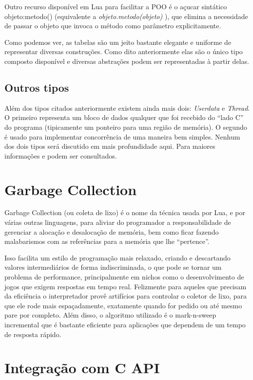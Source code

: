 \documentclass[a4paper,12pt]{abnt}
\begin{document}
Outro recurso disponível em Lua para facilitar a POO é o açucar sintático
objeto:metodo() (equivalente a \emph{objeto.metodo(objeto)} ), que elimina a
necessidade de passar o objeto que invoca o método como parâmetro explicitamente.

Como podemos ver, as tabelas são um jeito bastante elegante e uniforme de
representar diversas construções.
Como dito anteriormente elas são o único tipo composto disponível e
diversas abstrações podem ser representadas à partir delas.

\section{Outros tipos}

Além dos tipos citados anteriormente existem ainda mais dois:
\emph{Userdata} e \emph{Thread}. O primeiro representa um bloco de dados qualquer que
foi recebido do ``{}lado C''{} do programa (tipicamente um ponteiro para uma região de memória).
O segundo é usado para implementar concorrência de uma maneira bem simples.
Nenhum dos dois tipos será discutido em mais profundidade aqui. Para maiores
informações \cite{pil} e \cite{luamanual} podem ser consultados.

\chapter{Garbage Collection}

Garbage Collection (ou coleta de lixo) é o nome da técnica usada por Lua, e
por várias outras linguagens, para aliviar do programador a responsabilidade
de gerenciar a alocação e desalocação de memória, bem como ficar fazendo
malabarismos com as referências para a memória que lhe ``{}pertence''{}.

Isso facilita um estilo de programação mais relaxado,
criando e descartando valores
intermediários de forma indiscriminada, o que pode se tornar um problema de performance,
principalmente em nichos como o desenvolvimento de
jogos que exigem respostas em tempo real.
Felizmente para aqueles que precisam da eficiência o
interpretador provê artifícios para controlar o
coletor de lixo, para que ele rode mais espaçadamente,
exatamente quando for pedido ou até mesmo pare por completo.
Além disso, o algoritmo utilizado é o mark-n-sweep incremental \cite{luamanual}
que é bastante eficiente para aplicações que dependem de um tempo de resposta rápido.

\chapter{Integração com C API}
\end{document}
